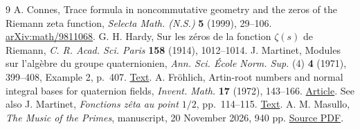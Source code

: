 \documentclass[11pt,reqno]{amsart}
\numberwithin{equation}{section}
\begin{document}
\begin{thebibliography}{9}
 A. Connes, Trace formula in noncommutative geometry and the zeros of the Riemann zeta function, \emph{Selecta Math. (N.S.)} \textbf{5} (1999), 29--106. \href{https://arxiv.org/abs/math/9811068}{arXiv:math/9811068}.
 G. H. Hardy, Sur les zéros de la fonction \(\zeta(s)\) de Riemann, \emph{C. R. Acad. Sci. Paris} \textbf{158} (1914), 1012--1014.
 J. Martinet, Modules sur l'alg\`ebre du groupe quaternionien, \emph{Ann. Sci. \'Ecole Norm. Sup.} (4) \textbf{4} (1971), 399--408, Example 2, p.~407. \href{https://www.numdam.org/article/ASENS_1971_4_4_3_399_0.pdf}{Text}.
 A. Fr\"ohlich, Artin-root numbers and normal integral bases for quaternion fields, \emph{Invent. Math.} \textbf{17} (1972), 143--166. \href{https://doi.org/10.1007/BF01418937}{Article}. See also J. Martinet, \emph{Fonctions z\^eta au point \(1/2\)}, pp.~114--115. \href{https://www.numdam.org/item/STNG_1971-1972__1__108_0.pdf}{Text}.
 A. M. Masullo, \emph{The Music of the Primes}, manuscript, 20 November 2026, 940 pp. \href{https://math216.wordpress.com/wp-content/uploads/2026/11/the-music-of-the-primes.pdf}{Source PDF}.
\end{thebibliography}
\end{document}
